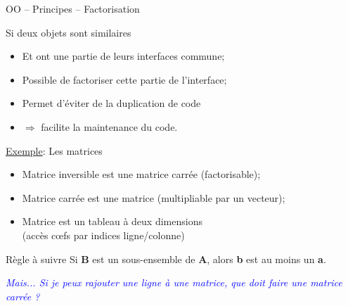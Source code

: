 \documentclass[compress,10pt,aspectratio=169]{beamer}
\begin{document}
  \begin{frame}[fragile]{OO -- Principes -- Factorisation }
    \scriptsize
  
    \begin{multicols}{2}
    \begin{block}{\small Si deux objets sont similaires}
    \begin{itemize}
    \item Et ont une partie de leurs interfaces commune;
    \item Possible de factoriser cette partie de l'interface;
    \item Permet d'éviter de la duplication de code 
    \item $\Rightarrow$ facilite la maintenance du code.
    \end{itemize}
    \end{block}
    \columnbreak  
    \begin{exampleblock}{\small \underline{Exemple}: Les matrices}
    \begin{itemize}
    \item Matrice inversible est une matrice carrée (factorisable);
    \item Matrice carrée est une matrice (multipliable par un vecteur);
    \item Matrice est un tableau à deux dimensions \\(accès c{\oe}fs par indices ligne/colonne)
    \end{itemize}
    \end{exampleblock}
  \end{multicols}
    
    \begin{alertblock}{\small Règle à suivre}
    Si \textbf{B} est un sous-ensemble de \textbf{A}, alors \textbf{b} est au moins un \textbf{a}.
    
    \textsl{\textcolor{blue}{Mais... Si je peux rajouter une ligne à une matrice, que doit faire une matrice carrée ?}}
    \end{alertblock}
    \end{frame}
    
\end{document}
